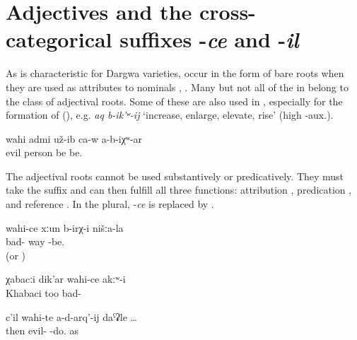 
\section{Adjectives and the cross-categorical suffixes -\textit{ce} and -\textit{il}}
\label{sec:adjmorphclasses} 

As is characteristic for Dargwa varieties,  occur in the form of bare roots when they are used as attributes to nominals , . Many but not all of the  in  belong to the class of adjectival roots. Some of these  are also used in , especially for the formation of  (), e.g. \textit{aq b-ik'ʷ-ij} `increase, enlarge, elevate, rise' (high -aux.).
%
\begin{exe}
	\ex	\label{ex:Probably he was a bad person}
	\gll	wahi	admi	už-ib ca-w	a-b-iχʷ-ar \\
		evil	person	be 	be.\\
	\glt	{}
\end{exe}

The adjectival roots cannot be used substantively or predicatively. They must take the suffix  and can then fulfill all three functions: attribution , predication ,  and reference . In the plural, -\textit{ce} is replaced by  .
%
\begin{exe}
	\ex	\label{ex:We had a bad road}
	\gll	wahi-ce	xːun	b-irχ-i	nišːa-la\\
		bad-	way	-be.	\\
	\glt	{} (or )

	\ex	\label{ex:Khabaci was also not bad_1}
	\gll	χabacːi	dik'ar	wahi-ce	akːʷ-i \\
		Khabaci	too	bad-	\\
	\glt	{}

	\ex	\label{ex:then like in order not to do bad} {
	\gll	c'il	wahi-te	a-d-arq'-ij	daˁʡle	\ldots\\
		then	evil- 	-do. as\\
	\glt	{}}
\end{exe}

